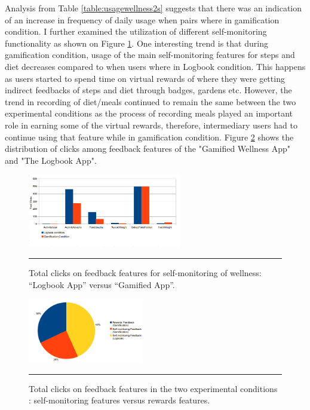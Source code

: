 Analysis from Table \ref{table:usagewellness2s} suggests that there was an indication of an increase in frequency of daily usage when pairs where in gamification condition.\newline
I further examined the utilization of different self-monitoring functionality as shown on Figure \ref{figure:self_monitoring_usage}. One interesting trend is that during gamification condition, usage of the main self-monitoring features for steps and diet decreases compared to when users where in Logbook condition. This happens as users started to spend time on virtual rewards of where they were getting indirect feedbacks of steps and diet through badges, gardens etc. However, the trend in recording of diet/meals continued to remain the same between the two experimental conditions as the process of recording meals played an important role in earning some of the virtual rewards, therefore, intermediary users had to continue using that feature while in gamification condition. Figure \ref{figure:clicks_distr} shows the distribution of clicks among feedback features of the "Gamified Wellness App" and "The Logbook App".\newline 
\begin{figure}[htbp]
  \centering
    \includegraphics[width=0.6\textwidth]{Figures/self_monitoring_usage.png}
    \rule{35em}{0.5pt}
  \caption{Total clicks on feedback features for self-monitoring of wellness: ``Logbook App'' versus ``Gamified App''.}
  \label{figure:self_monitoring_usage}
\end{figure}\newline
\begin{figure}[htbp]
  \centering
    \includegraphics[width=0.45\textwidth]{Figures/clicks_distr.png}
    \rule{35em}{0.5pt}
  \caption{Total clicks on feedback features in the two experimental conditions : self-monitoring features versus rewards features.}
  \label{figure:clicks_distr}
\end{figure}\newline
